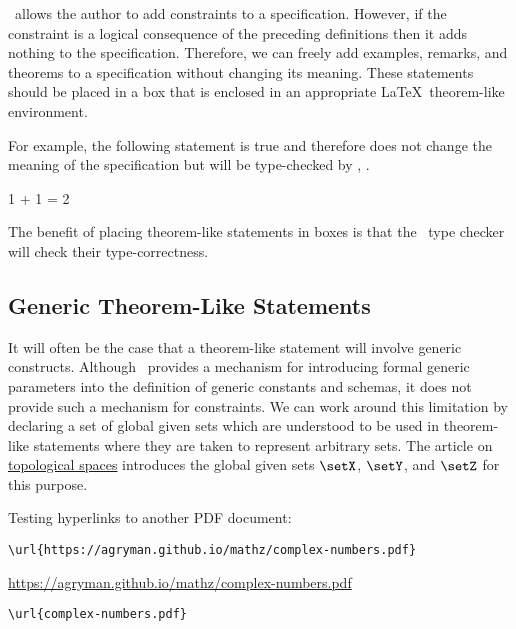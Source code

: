 \documentclass{amsart}
\begin{document}
\ZN\ allows the author to add constraints to a specification.
However, if the constraint is a logical consequence of the preceding definitions then it adds nothing to the specification.
Therefore, we can freely add examples, remarks, and theorems to a specification without changing its meaning.
These statements should be placed in a  box that is enclosed in an appropriate \LaTeX\ theorem-like environment.

For example, the following statement is true and therefore does not change the meaning of
the specification but will be type-checked by \fuzz, .

\begin{example}

\begin{zed}
	1 + 1 = 2
\end{zed}
	
\end{example}

The benefit of placing theorem-like statements in  boxes is that the \fuzz\ type checker will check their type-correctness.

\subsection{Generic Theorem-Like Statements}

It will often be the case that a theorem-like statement will involve generic constructs.
Although \ZN\ provides a mechanism for introducing formal generic parameters into the definition of
generic constants and schemas, it does not provide such a mechanism for constraints.
We can work around this limitation by declaring a set of global given sets which are understood to be used in theorem-like
statements where they are taken to represent arbitrary sets.
The article on \href{topological-spaces.pdf}{topological spaces} 
introduces the global given sets $\setX$, $\setY$, and $\setZ$ for this purpose.

Testing hyperlinks to another PDF document:

\begin{verbatim}
\url{https://agryman.github.io/mathz/complex-numbers.pdf}
\end{verbatim}

\url{https://agryman.github.io/mathz/complex-numbers.pdf}

\begin{verbatim}
\url{complex-numbers.pdf}
\end{verbatim}
\end{document}
